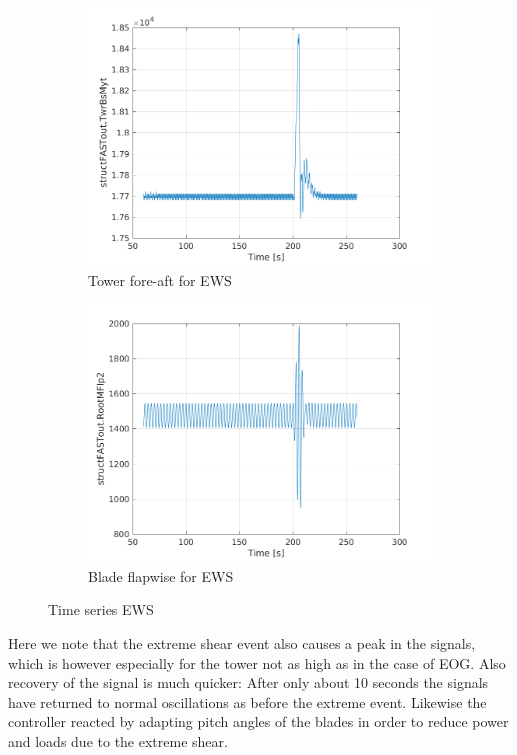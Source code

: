 \documentclass[10pt]{article}
\begin{document}
\begin{figure}[H]
  \centering
\begin{subfigure}{0.40\textwidth}
  \includegraphics[width=1\linewidth]{../CIP_6/FASTextreme/EWSVR/TwrBsMyt.png}
    \caption{Tower fore-aft for EWS}
\end{subfigure}
\begin{subfigure}{0.40\textwidth}
  \includegraphics[width=1\linewidth]{../CIP_6/FASTextreme/EWSVR/RootMFlp2.png}
    \caption{Blade flapwise for EWS}
\end{subfigure}
\caption{Time series EWS}
\label{fig:lc15signal}
\end{figure}

Here we note that the extreme shear event also causes a peak in the signals, which is however especially for the tower not as high as in the case of EOG. Also recovery of the signal is much quicker: After only about 10 seconds the signals have returned to normal oscillations as before the extreme event. Likewise the controller reacted by adapting pitch angles of the blades in order to reduce power and loads due to the extreme shear.\\
\end{document}
